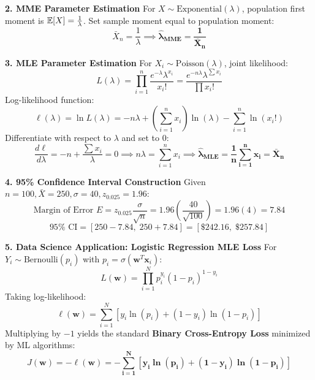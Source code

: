 \textbf{2. MME Parameter Estimation}
For $X \sim \text{Exponential}(\lambda)$, population first moment is $\mathbb{E}[X] = \frac{1}{\lambda}$.
Set sample moment equal to population moment:
$$\bar{X}_n = \frac{1}{\lambda} \implies \mathbf{\hat{\lambda}_{\text{MME}} = \frac{1}{\bar{X}_n}}$$

\textbf{3. MLE Parameter Estimation}
For $X_i \sim \text{Poisson}(\lambda)$, joint likelihood:
$$L(\lambda) = \prod_{i=1}^n \frac{e^{-\lambda} \lambda^{x_i}}{x_i!} = \frac{e^{-n\lambda} \lambda^{\sum x_i}}{\prod x_i!}$$
Log-likelihood function:
$$\ell(\lambda) = \ln L(\lambda) = -n\lambda + \left(\sum_{i=1}^n x_i\right) \ln(\lambda) - \sum_{i=1}^n \ln(x_i!)$$
Differentiate with respect to $\lambda$ and set to $0$:
$$\frac{d\ell}{d\lambda} = -n + \frac{\sum x_i}{\lambda} = 0 \implies n \lambda = \sum_{i=1}^n x_i \implies \mathbf{\hat{\lambda}_{\text{MLE}} = \frac{1}{n} \sum_{i=1}^n x_i = \bar{X}_n}$$

\textbf{4. 95\% Confidence Interval Construction}
Given $n = 100, \bar{X} = 250, \sigma = 40, z_{0.025} = 1.96$:
$$\text{Margin of Error } E = z_{0.025} \frac{\sigma}{\sqrt{n}} = 1.96 \left( \frac{40}{\sqrt{100}} \right) = 1.96 (4) = 7.84$$
$$95\% \text{ CI} = [250 - 7.84, \; 250 + 7.84] = \mathbf{[\$242.16, \; \$257.84]}$$

\textbf{5. Data Science Application: Logistic Regression MLE Loss}
For $Y_i \sim \text{Bernoulli}(p_i)$ with $p_i = \sigma(\mathbf{w}^T \mathbf{x}_i)$:
$$L(\mathbf{w}) = \prod_{i=1}^N p_i^{y_i} (1 - p_i)^{1 - y_i}$$
Taking log-likelihood:
$$\ell(\mathbf{w}) = \sum_{i=1}^N \left[ y_i \ln(p_i) + (1 - y_i) \ln(1 - p_i) \right]$$
Multiplying by $-1$ yields the standard \textbf{Binary Cross-Entropy Loss} minimized by ML algorithms:
$$J(\mathbf{w}) = -\ell(\mathbf{w}) = \mathbf{-\sum_{i=1}^N \left[ y_i \ln(p_i) + (1 - y_i) \ln(1 - p_i) \right]}$$


